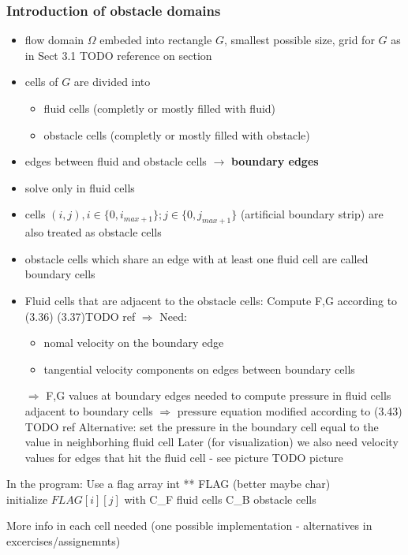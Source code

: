 \subsubsection{Introduction of obstacle domains}
\begin{itemize}
	\item flow domain $\Omega$ embeded into rectangle $G$, smallest possible size, grid for $G$ as in Sect 3.1 TODO reference on section
	\item cells of $G$ are divided into
	\begin{itemize}
		\item fluid cells (completly or mostly filled with fluid)
		\item obstacle cells (completly or mostly filled with obstacle)
	\end{itemize}
	\item edges between fluid and obstacle cells $\rightarrow$ \textbf{boundary edges}
	\item solve only in fluid cells
	\item cells $(i,j), i \in \{0, i_{max+1}\}; j \in \{0,j_{max+1}\}$
	(artificial boundary strip) are also treated as obstacle cells
	\item obstacle cells which share an edge with at least one fluid cell are called boundary cells
	\item Fluid cells that are adjacent to the obstacle cells: Compute F,G according to (3.36) (3.37)TODO ref
	$\Rightarrow$ Need: 
	\begin{itemize}
		\item nomal velocity on the boundary edge
		\item tangential velocity components on edges between boundary cells
	\end{itemize}
	\item[$\Rightarrow$] F,G values at boundary edges needed to compute pressure in fluid cells adjacent to boundary cells $\Rightarrow$ pressure equation modified according to (3.43) TODO ref
	Alternative: set the pressure in the boundary cell equal to the value in neighborhing fluid cell
	Later (for visualization) we also need velocity values for edges that hit the fluid cell - see picture TODO picture
\end{itemize}

In the program: Use a flag array int ** FLAG (better maybe char)\\
initialize $FLAG[i][j]$ with C\_F fluid cells
C\_B obstacle cells

More info in each cell needed (one possible implementation - alternatives in excercises/assignemnts)

